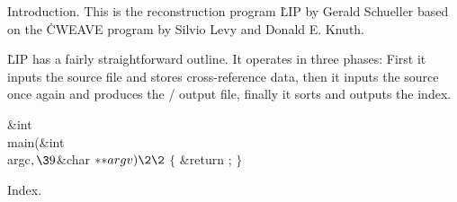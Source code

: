 

Introduction.
This is the reconstruction program \.{LIP} by Gerald Schueller
based on the \.{CWEAVE} program by Silvio Levy and Donald E. Knuth.

\fi

\.{LIP} has a fairly straightforward outline. It operates in
three phases: First it inputs the source file and stores cross-reference
data, then it inputs the source once again and produces the \TEX/ output
file, finally it sorts and outputs the index.

\Y\B\1\1\&{int} \\{main}(\&{int} \\{argc}${},\39{}$\&{char} ${}{*}{*}\\{argv})%
\2\2{}$\6
${}\{{}$\1\6
\&{return} ;\6
\4${}\}{}$\2\par
\fi

Index.
\fi

\inx
\fin
\con
